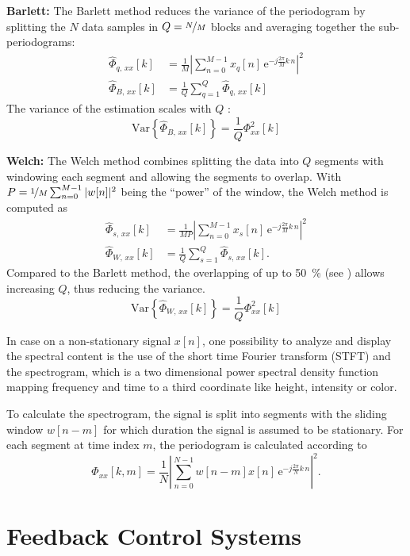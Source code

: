 \textbf{Barlett:} The Barlett method reduces the variance of the periodogram by splitting the $N$ data samples in $Q=\nicefrac{N}{M}$ blocks and averaging together the sub-periodograms:
\begin{align}
\hat{\Phi}_{q,\,xx}[k] &= \frac{1}{M} \left| \sum_{n=0}^{M-1} x_q[n]\,\text{e}^{-j\frac{2\pi}{M}k\,n}\right|^2\\
\hat{\Phi}_{B,\,xx}[k] &= \frac{1}{Q} \sum_{q=1}^{Q} \hat{\Phi}_{q,\,xx}[k]
\end{align}
The variance of the estimation scales with $Q$ \cite[p.~6]{Rowell2008}:
\begin{equation}
\text{Var}\left\{\hat{\Phi}_{B,\,xx}[k]\right\} = \frac{1}{Q}\Phi_{xx}^2[k]
\end{equation}

\textbf{Welch:} The Welch method combines splitting the data into $Q$ segments with windowing each segment and allowing the segments to overlap. With $P = \nicefrac{1}{M} \sum_{n=0}^{M-1} |w[n]|^2$ being the ``power'' of the window, the Welch method is computed as
\begin{align}
\hat{\Phi}_{s,\,xx}[k] &= \frac{1}{M P} \left| \sum_{n=0}^{M-1} x_s[n]\,\text{e}^{-j\frac{2\pi}{M}k\,n}\right|^2\\
\hat{\Phi}_{W,\,xx}[k] &= \frac{1}{Q} \sum_{s=1}^{Q} \hat{\Phi}_{s,\,xx}[k].
\end{align}
Compared to the Barlett method, the overlapping of up to \SI{50}{\percent} (see \cite{Welch1967}) allows increasing $Q$, thus reducing the variance.
\begin{equation}\label{eq:varWelch}
\text{Var}\left\{\hat{\Phi}_{W,\,xx}[k]\right\} = \frac{1}{Q}\Phi_{xx}^2[k]
\end{equation}


In case on a non-stationary signal $x[n]$, one possibility to analyze and display the spectral content is the use of the short time Fourier transform (STFT) and the spectrogram, which is a two dimensional power spectral density function mapping frequency and time to a third coordinate like height, intensity or color.

To calculate the spectrogram, the signal is split into segments with the sliding window $w[n-m]$ for which duration the signal is assumed to be stationary. For each segment at time index $m$, the periodogram is calculated according to
\begin{equation}
\hat{\Phi}_{xx}[k,m] = \frac{1}{N} \left| \sum_{n=0}^{N-1} w[n-m] x[n]\,\text{e}^{-j\frac{2\pi}{N}k\,n}\right|^2.
\end{equation}

\section{Feedback Control Systems}







